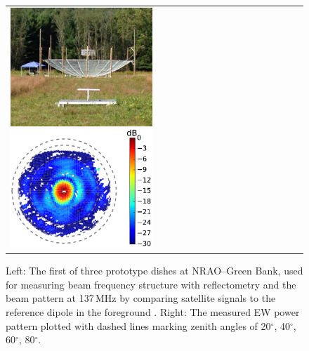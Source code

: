 \documentclass[preprint,11pt]{aastex}
\begin{document}
\begin{figure}[h!]
	\begin{tabular}{ll}
	\begin{minipage}{4.2in}
\includegraphics[width=2.1in]{plots/ref_dipole_and_hera_dish.jpg}
\includegraphics[width=2.1in]{plots/orbcomm_dish_beam_map_530cm_feed.pdf}
	\end{minipage} & 
	\begin{minipage}{2.05in}
	\caption{Left: The first of three prototype dishes at NRAO--Green Bank, used for measuring beam frequency structure with reflectometry and the beam pattern at 137\,MHz by comparing satellite signals to the reference dipole in the foreground \citep{neben_et_al2016}. Right: The measured EW power pattern plotted with dashed lines marking zenith angles of 20$^\circ$, 40$^\circ$, 60$^\circ$, 80$^\circ$.} 
	\label{fig:orbcommexptandbeammap}
	\end{minipage}
	\end{tabular}
	\vspace{-15pt}
\end{figure}
\end{document}
